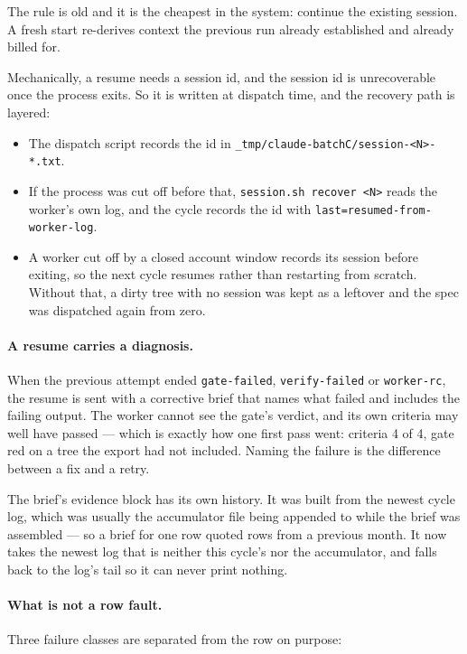The rule is old and it is the cheapest in the system: continue the existing session. A fresh
start re-derives context the previous run already established and already billed for.

Mechanically, a resume needs a session id, and the session id is unrecoverable once the
process exits. So it is written at dispatch time, and the recovery path is layered:

\begin{itemize}
	\item The dispatch script records the id in \texttt{\_tmp/claude-batchC/session-<N>-*.txt}.
	\item If the process was cut off before that, \texttt{session.sh recover <N>} reads the
	worker's own log, and the cycle records the id with \texttt{last=resumed-from-worker-log}.
	\item A worker cut off by a closed account window records its session before exiting, so
	the next cycle resumes rather than restarting from scratch. Without that, a dirty tree with
	no session was kept as a leftover and the spec was dispatched again from zero.
\end{itemize}

\paragraph{A resume carries a diagnosis.} When the previous attempt ended
\texttt{gate-failed}, \texttt{verify-failed} or \texttt{worker-rc}, the resume is sent with a
corrective brief that names what failed and includes the failing output. The worker cannot see
the gate's verdict, and its own criteria may well have passed --- which is exactly how one
first pass went: criteria 4 of 4, gate red on a tree the export had not included. Naming the
failure is the difference between a fix and a retry.

The brief's evidence block has its own history. It was built from the newest cycle log, which
was usually the accumulator file being appended to while the brief was assembled --- so a
brief for one row quoted rows from a previous month. It now takes the newest log that is
neither this cycle's nor the accumulator, and falls back to the log's tail so it can never
print nothing.

\paragraph{What is not a row fault.} Three failure classes are separated from the row on
purpose:

